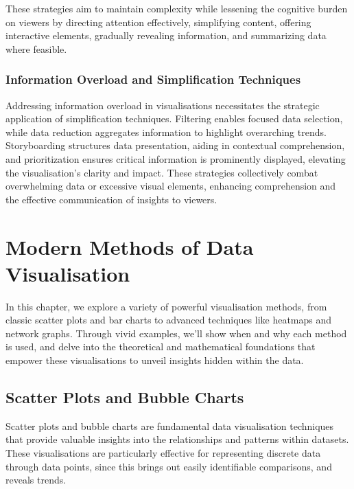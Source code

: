 \documentclass{article}\usepackage[]{graphicx}\usepackage[]{xcolor}
\begin{document}
\noindent

These strategies aim to maintain complexity while lessening the cognitive burden on viewers by directing attention effectively, simplifying content, offering interactive elements, gradually revealing information, and summarizing data where feasible.

\subsubsection{Information Overload and Simplification Techniques}

Addressing information overload in visualisations necessitates the strategic application of simplification techniques. Filtering enables focused data selection, while data reduction aggregates information to highlight overarching trends. Storyboarding structures data presentation, aiding in contextual comprehension, and prioritization ensures critical information is prominently displayed, elevating the visualisation's clarity and impact. These strategies collectively combat overwhelming data or excessive visual elements, enhancing comprehension and the effective communication of insights to viewers.


\newpage

\section{Modern Methods of Data Visualisation}

In this chapter, we explore a variety of powerful visualisation methods, from classic scatter plots and bar charts to advanced techniques like heatmaps and network graphs. Through vivid examples, we'll show when and why each method is used, and delve into the theoretical and mathematical foundations that empower these visualisations to unveil insights hidden within the data.

\subsection{Scatter Plots and Bubble Charts}

Scatter plots and bubble charts are fundamental data visualisation techniques that provide valuable insights into the relationships and patterns within datasets. These visualisations are particularly effective for representing discrete data through data points, since this brings out easily identifiable comparisons, and reveals trends.
\end{document}
